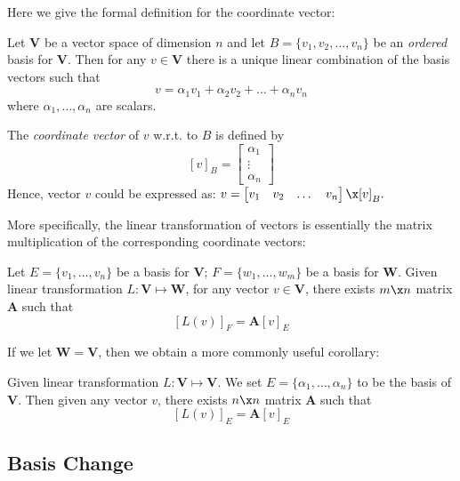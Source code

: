 Here we give the formal definition for the coordinate vector:
\begin{definition}
Let $\bm V$ be a vector space of dimension $n$ and let $B=\{v_1,v_2,\dots,v_n\}$ be an \emph{ordered} basis for $\bm V$. Then for any $v\in\bm V$ there is a unique linear combination of the basis vectors such that
\[
v=\alpha_1v_1+\alpha_2v_2+\dots+\alpha_nv_n
\]
where $\alpha_1,\dots,\alpha_n$ are scalars.

The \emph{coordinate vector} of $v$ w.r.t. to $B$ is defined by
\[
[v]_{B}=\begin{bmatrix}
\alpha_1\\\vdots\\\alpha_n
\end{bmatrix}
\]
Hence, vector $v$ could be expressed as:
$
v=\begin{bmatrix}
v_1&v_2&\dots&v_n
\end{bmatrix}\x [v]_{B}.
$
\end{definition}
More specifically, the linear transformation of vectors is essentially the matrix multiplication of the corresponding coordinate vectors:
\begin{theorem}
Let $E=\{v_1,\dots,v_n\}$ be a basis for $\bm V$; $F=\{w_1,\dots,w_m\}$ be a basis for $\bm W$. Given linear transformation $L:\bm V\mapsto \bm W$, for any vector $v\in\bm V$, there exists $m\x n$ matrix $\bm A$ such that
\[
[L(v)]_F=\bm A[v]_E
\]
\end{theorem}
If we let $\bm W=\bm V$, then we obtain a more commonly useful corollary:
\begin{corollary}\label{matrix_representation}
Given linear transformation $L:\bm V\mapsto \bm V$. We set $E = \{\alpha_1,\dots,\alpha_n\}$ to be the basis of $\bm V$. Then given any vector $v$, there exists $n\x n$ matrix $\bm A$ such that
\[
[L(v)]_{E}=\bm A[v]_{E}
\]
\end{corollary}
\subsection{Basis Change}
